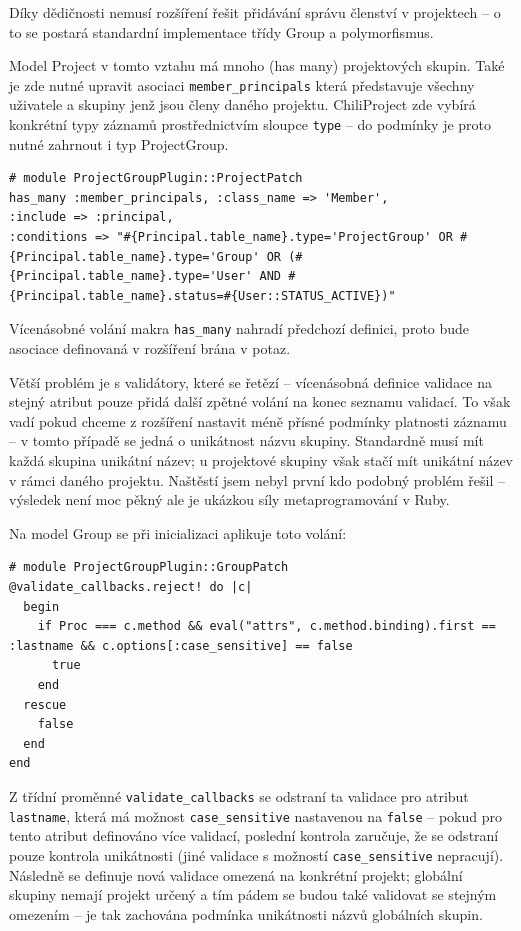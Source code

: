 \documentclass[thesis=B,czech]{FITthesis}[2012/05/02]
\begin{document}
Díky dědičnosti nemusí rozšíření řešit přidávání správu členství v
projektech -- o to se postará standardní implementace třídy Group a
polymorfismus.

Model Project v tomto vztahu má mnoho (has many) projektových skupin.
Také je zde nutné upravit asociaci \lstinline!member_principals! která
představuje všechny uživatele a skupiny jenž jsou členy daného projektu.
ChiliProject zde vybírá konkrétní typy záznamů prostřednictvím sloupce
\lstinline!type! -- do podmínky je proto nutné zahrnout i typ
ProjectGroup.

\begin{lstlisting}
# module ProjectGroupPlugin::ProjectPatch
has_many :member_principals, :class_name => 'Member',
:include => :principal,
:conditions => "#{Principal.table_name}.type='ProjectGroup' OR #{Principal.table_name}.type='Group' OR (#{Principal.table_name}.type='User' AND #{Principal.table_name}.status=#{User::STATUS_ACTIVE})"
\end{lstlisting}
Vícenásobné volání makra \lstinline!has_many! nahradí předchozí
definici, proto bude asociace definovaná v rozšíření brána v potaz.

Větší problém je s validátory, které se řetězí -- vícenásobná definice
validace na stejný atribut pouze přidá další zpětné volání na konec
seznamu validací. To však vadí pokud chceme z rozšíření nastavit méně
přísné podmínky platnosti záznamu -- v tomto případě se jedná o
unikátnost názvu skupiny. Standardně musí mít každá skupina unikátní
název; u projektové skupiny však stačí mít unikátní název v rámci daného
projektu. Naštěstí jsem nebyl první kdo podobný problém řešil
\citep{McAlpin2011} -- výsledek není moc pěkný ale je ukázkou síly
metaprogramování v Ruby.

Na model Group se při inicializaci aplikuje toto volání:

\begin{lstlisting}
# module ProjectGroupPlugin::GroupPatch
@validate_callbacks.reject! do |c|
  begin
    if Proc === c.method && eval("attrs", c.method.binding).first == :lastname && c.options[:case_sensitive] == false
      true
    end
  rescue
    false
  end
end
\end{lstlisting}
Z třídní proměnné \lstinline!validate_callbacks! se odstraní ta validace
pro atribut \lstinline!lastname!, která má možnost
\lstinline!case_sensitive! nastavenou na \lstinline!false! -- pokud pro
tento atribut definováno více validací, poslední kontrola zaručuje, že
se odstraní pouze kontrola unikátnosti (jiné validace s možností
\lstinline!case_sensitive! nepracují). Následně se definuje nová
validace omezená na konkrétní projekt; globální skupiny nemají projekt
určený a tím pádem se budou také validovat se stejným omezením -- je tak
zachována podmínka unikátnosti názvů globálních skupin.
\end{document}
